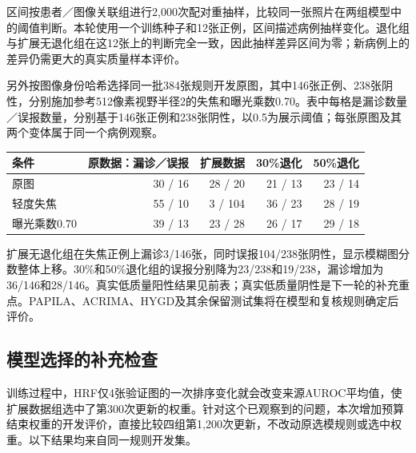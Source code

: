 \documentclass[
  10pt,
]{article}
\begin{document}
区间按患者／图像关联组进行2,000次配对重抽样，比较同一张照片在两组模型中的阈值判断。本轮使用一个训练种子和12张正例，区间描述病例抽样变化。退化组与扩展无退化组在这12张上的判断完全一致，因此抽样差异区间为零；新病例上的差异仍需更大的真实质量样本评价。

另外按图像身份哈希选择同一批384张规则开发原图，其中146张正例、238张阴性，分别施加参考512像素视野半径2的失焦和曝光乘数0.70。表中每格是漏诊数量／误报数量，分别基于146张正例和238张阴性，以0.5为展示阈值；每张原图及其两个变体属于同一个病例观察。

\begin{longtable}[]{@{}lrrrr@{}}
\toprule\noalign{}
条件 & 原数据：漏诊／误报 & 扩展数据 & 30\%退化 & 50\%退化 \\
\midrule\noalign{}
\endhead
\bottomrule\noalign{}
\endlastfoot
原图 & 30 / 16 & 28 / 20 & 21 / 13 & 23 / 14 \\
轻度失焦 & 55 / 10 & 3 / 104 & 36 / 23 & 28 / 19 \\
曝光乘数0.70 & 39 / 13 & 23 / 28 & 26 / 17 & 29 / 18 \\
\end{longtable}

扩展无退化组在失焦正例上漏诊3/146张，同时误报104/238张阴性，显示模糊图分数整体上移。30\%和50\%退化组的误报分别降为23/238和19/238，漏诊增加为36/146和28/146。真实低质量阳性结果见前表；真实低质量阴性是下一轮的补充重点。PAPILA、ACRIMA、HYGD及其余保留测试集将在模型和复核规则确定后评价。

\subsection{模型选择的补充检查}\label{ux6a21ux578bux9009ux62e9ux7684ux8865ux5145ux68c0ux67e5}

训练过程中，HRF仅4张验证图的一次排序变化就会改变来源AUROC平均值，使扩展数据组选中了第300次更新的权重。针对这个已观察到的问题，本次增加预算结束权重的开发评价，直接比较四组第1,200次更新，不改动原选模规则或选中权重。以下结果均来自同一规则开发集。
\end{document}
